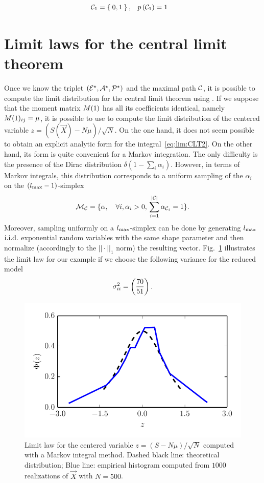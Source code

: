 \documentclass{article}
\begin{document}
\begin{equation} \begin{aligned}
 \pC_{1} =\Set{0,1}, \quad &p\p{\pC_{1}} =1 %
\end{aligned} \end{equation} 
\section{Limit laws for the central limit theorem}

Once we know the triplet $(\mathcal{E}^{\star},\mathcal{A}^{\star},\mathcal{P}^{\star})$ and the maximal path $\mathcal C $, it is possible to compute the limit distribution
for the central limit theorem using . 
If we suppose that the moment matrix $M(1)$ has all its coefficients identical, namely $M(1)_{ij}= \mu$, it is possible to use 
to compute the limit distribution of the centered variable $z = (S(\vec X) - N\mu )/ \sqrt{N}$.
On the one hand, it does not seem possible to obtain an explicit analytic form for the integral~\eqref{eq:lim:CLT2}.
On the other hand, its form is quite convenient for a Markov integration.
The only difficulty is the presence of the Dirac distribution $\delta(1 - \sum_i \alpha_i )$.
However, in terms of Markov integrals, this distribution corresponds to a uniform sampling of the $\alpha_i$ on the $({l_{\max}}-1)$-simplex
\begin{equation}
\mathcal M_\mathcal C = \{ \alpha,\quad \forall i ,  \alpha_i >0,\, \sum_{i=1}^{|\mathcal C | } \alpha_{\mathcal C _i}=1 \}. 
\end{equation}
Moreover, sampling uniformly on a ${l_{\max}}$-simplex can be done by generating ${l_{\max}}$
$\mathrm{i.i.d.}$ exponential random variables with the same shape parameter and then normalize (accordingly to the $||\cdot ||_1$ norm) the
resulting vector. Fig.~\ref{fig:clt} illustrates the limit law for our example if we choose
the following variance for the reduced model 
\begin{equation}
\sigma^{2}_{ii} = \left(\frac{70}{51}\right).
\end{equation}
%
\begin{figure}
\centerline{ \includegraphics[width=0.7\columnwidth]{Figs/CLT} }
\caption{ \label{fig:clt} Limit law for the centered variable $z=(S-N\mu)/\sqrt{N}$ computed with a Markov integral method. Dashed black line: theoretical distribution; Blue line:
empirical histogram computed from $1000$ realizations of $\vec X$ with $N=500$.}
\end{figure}
\end{document}
